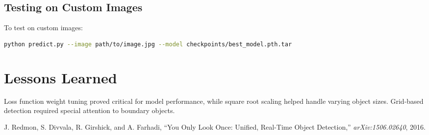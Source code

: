 \documentclass[conference]{IEEEtran}
\begin{document}
\subsection{Testing on Custom Images}
To test on custom images:
\begin{lstlisting}[language=bash]
python predict.py --image path/to/image.jpg --model checkpoints/best_model.pth.tar
\end{lstlisting}

\section{Lessons Learned}
Loss function weight tuning proved critical for model performance, while square root scaling helped handle varying object sizes. Grid-based detection required special attention to boundary objects.

\begin{thebibliography}{9}
J. Redmon, S. Divvala, R. Girshick, and A. Farhadi,
``You Only Look Once: Unified, Real-Time Object Detection,''
\textit{arXiv:1506.02640}, 2016.
\end{thebibliography}
\end{document}
